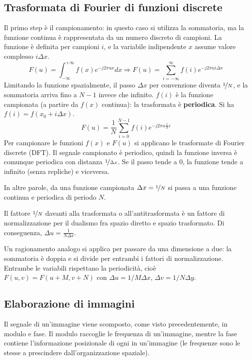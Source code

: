 \subsection{Trasformata di Fourier di funzioni discrete}
Il primo step è il campionamento: in questo caso si utilizza la sommatoria, ma la funzione continua è rappresentata da un numero discreto di campioni. La funzione è definita per campioni $i$, e la variabile indipendente $x$ assume valore complesso $i\Delta x$.
$$F(u) = \int_{-\infty}^{+\infty} f(x)e^{-j2\pi ux} dx \Longrightarrow F(u) = \sum_{i=-\infty}^{\infty} f(i)e^{-j2\pi ui\Delta x}$$
Limitando la funzione spazialmente, il passo $\Delta x$ per convenzione diventa $\nicefrac{1}{N}$, e la sommatoria arriva fino a $N - 1$ invece che infinito. $f(i)$ è la funzione campionata (a partire da $f(x)$ continua): la trasformata è \textbf{periodica}. Si ha $f(i) = f(x_0 + i\Delta x)$.
$$F(u) = \frac{1}{N} \sum_{i=0}^{N-1} f(i)e^{-j2\pi u \frac{1}{N}i}$$
Per campionare le funzioni $f(x)$ e $F(u)$ si applicano le trasformate di Fourier discrete (DFT). Il segnale campionato è periodico, quindi la funzione inversa è comunque periodica con distanza $\nicefrac{1}{\Delta x}$. Se il passo tende a 0, la funzione tende a infinito (senza repliche) e viceversa. 

In altre parole, da una funzione campionata $\Delta x = \nicefrac{1}{N}$ si passa a una funzione continua e periodica di periodo $N$. 

Il fattore $\nicefrac{1}{N}$ davanti alla trasformata o all'antitrasformata è un fattore di normalizzazione per il dualismo fra spazio diretto e spazio trasformato. Di conseguenza, $\Delta u = \frac{1}{N\Delta x}$.

Un ragionamento analogo si applica per passare da una dimensione a due: la sommatoria è doppia e si divide per entrambi i fattori di normalizzazione. Entrambe le variabili rispettano la periodicità, cioè $F(u, v) = F(u + M, v + N)$ con $\Delta u = 1/M \Delta x$, $\Delta v = 1/N \Delta y$.

\subsection{Elaborazione di immagini}
Il segnale di un'immagine viene scomposto, come visto precedentemente, in modulo e fase. Il modulo raccoglie le frequenza di un'immagine, mentre la fase contiene l'informazione posizionale di ogni in un'immagine (le frequenze sono le stesse a prescindere dall'organizzazione spaziale).

